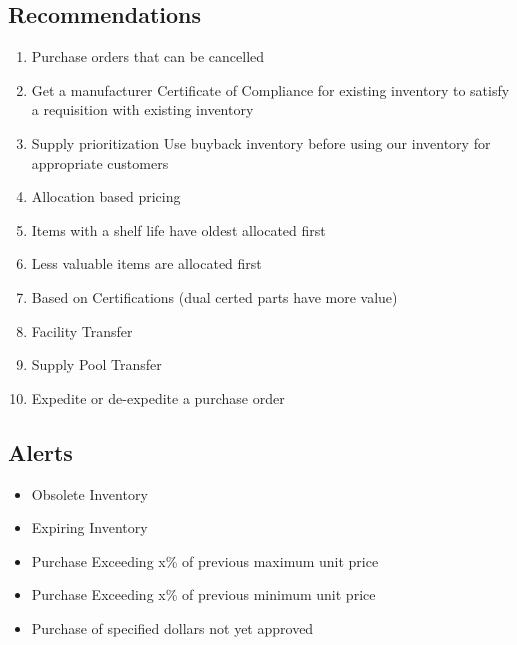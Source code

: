 \documentclass[letterpaper,10pt,english]{sphinxmanual}
\begin{document}
\subsection{Recommendations}
\label{BusinessProcessReengineering:id11}\begin{enumerate}
\item {} 
Purchase orders that can be cancelled

\item {} 
Get a manufacturer Certificate of Compliance for existing inventory
to satisfy a requisition with existing inventory

\item {} 
Supply prioritization Use buyback inventory before using our
inventory for appropriate customers

\item {} 
Allocation based pricing

\item {} 
Items with a shelf life have oldest allocated first

\item {} 
Less valuable items are allocated first

\item {} 
Based on Certifications (dual certed parts have more value)

\item {} 
Facility Transfer

\item {} 
Supply Pool Transfer

\item {} 
Expedite or de-expedite a purchase order

\end{enumerate}


\subsection{Alerts}
\label{BusinessProcessReengineering:id12}\begin{itemize}
\item {} 
Obsolete Inventory

\item {} 
Expiring Inventory

\item {} 
Purchase Exceeding x\% of previous maximum unit price

\item {} 
Purchase Exceeding x\% of previous minimum unit price

\item {} 
Purchase of specified dollars not yet approved

\end{itemize}
\end{document}
